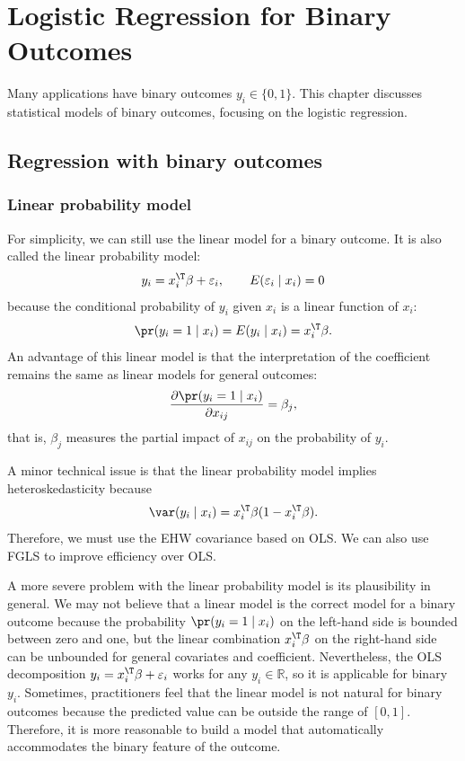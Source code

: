  
\chapter{Logistic Regression for Binary Outcomes}
 \label{chapter::binary-logit}

Many applications have binary outcomes $y_i \in \{0, 1\}$. This chapter discusses statistical models of binary outcomes, focusing on the logistic regression.  


\section{Regression with binary outcomes}






\subsection{Linear probability model}

For simplicity, we can still use the linear model for a binary outcome. It is also called the linear probability model:
\[
y_{i}=x_{i}^{\T}\beta+\varepsilon_{i},\qquad E(\varepsilon_{i}\mid x_{i})=0
\]
because the conditional probability of $y_{i}$ given $x_{i}$ is
a linear function of $x_{i}$: 
\[
\pr(y_{i}=1\mid x_{i})=E(y_{i}\mid x_{i})=x_{i}^{\T}\beta.
\]
An advantage of this linear model is  that the interpretation of the coefficient remains the same as linear models for general outcomes:
$$
\frac{ \partial  \pr(y_{i}=1\mid x_{i})  }{  \partial x_{ij} } = \beta_j,
$$
that is, $\beta_j$ measures the partial impact of $x_{ij}$ on the probability of $y_i$. 


A minor technical issue is that the linear probability model implies heteroskedasticity because
$$
\var(y_i\mid x_i) = x_{i}^{\T}\beta (1-x_{i}^{\T}\beta).
$$
Therefore, we must use the EHW covariance based on OLS. We can also use FGLS to improve efficiency over OLS. 


A more severe problem with the linear probability model is its plausibility in general. We may not believe that a linear model is the correct model for a binary outcome because the probability $\pr(y_{i}=1\mid x_{i})$ on the left-hand side is bounded between zero and one, but the linear combination $x_{i}^{\T}\beta$ on the right-hand side can be unbounded for general covariates and coefficient. Nevertheless, the OLS decomposition $y_{i}=x_{i}^{\T}\beta+\varepsilon_{i}$
works for any $y_{i}\in\mathbb{R}$, so it is applicable for binary
$y_i$. Sometimes, practitioners feel that the linear model is not natural for binary outcomes because
the predicted value can be outside the range of $[0,1]$. Therefore,
it is more reasonable to build a model that automatically accommodates
the binary feature of the outcome. 


